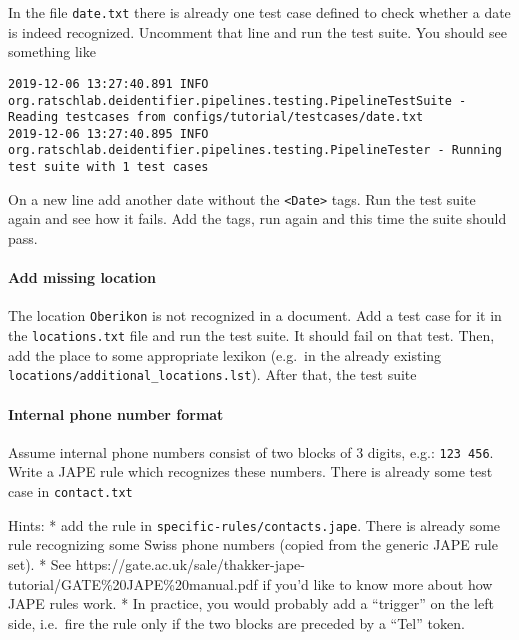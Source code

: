 In the file \texttt{date.txt} there is already one test case defined to
check whether a date is indeed recognized. Uncomment that line and run
the test suite. You should see something like

\begin{verbatim}
2019-12-06 13:27:40.891 INFO  org.ratschlab.deidentifier.pipelines.testing.PipelineTestSuite - Reading testcases from configs/tutorial/testcases/date.txt
2019-12-06 13:27:40.895 INFO  org.ratschlab.deidentifier.pipelines.testing.PipelineTester - Running test suite with 1 test cases
\end{verbatim}

On a new line add another date without the
\texttt{\textless{}Date\textgreater{}} tags. Run the test suite again
and see how it fails. Add the tags, run again and this time the suite
should pass.

\paragraph{Add missing location}\label{add-missing-location}

The location \texttt{Oberikon} is not recognized in a document. Add a
test case for it in the \texttt{locations.txt} file and run the test
suite. It should fail on that test. Then, add the place to some
appropriate lexikon (e.g.~in the already existing
\texttt{locations/additional\_locations.lst}). After that, the test
suite

\paragraph{Internal phone number
format}\label{internal-phone-number-format}

Assume internal phone numbers consist of two blocks of 3 digits, e.g.:
\texttt{123\ 456}. Write a JAPE rule which recognizes these numbers.
There is already some test case in \texttt{contact.txt}

Hints: * add the rule in \texttt{specific-rules/contacts.jape}. There is
already some rule recognizing some Swiss phone numbers (copied from the
generic JAPE rule set). * See
https://gate.ac.uk/sale/thakker-jape-tutorial/GATE\%20JAPE\%20manual.pdf
if you'd like to know more about how JAPE rules work. * In practice, you
would probably add a ``trigger'' on the left side, i.e.~fire the rule
only if the two blocks are preceded by a ``Tel'' token.
